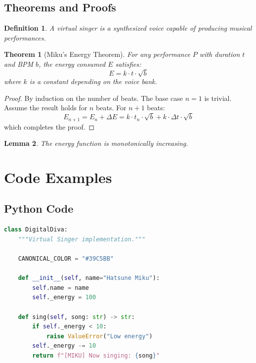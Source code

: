\documentclass[12pt, a4paper]{article}
\newtheorem{theorem}{Theorem}[section]
\newtheorem{lemma}[theorem]{Lemma}
\newtheorem{definition}{Definition}[section]
\begin{document}
\subsection{Theorems and Proofs}

\begin{definition}
A \emph{virtual singer} is a synthesized voice capable of producing musical performances.
\end{definition}

\begin{theorem}[Miku's Energy Theorem]
\label{thm:energy}
For any performance $P$ with duration $t$ and BPM $b$, the energy consumed $E$ satisfies:
\[
    E = k \cdot t \cdot \sqrt{b}
\]
where $k$ is a constant depending on the voice bank.
\end{theorem}

\begin{proof}
By induction on the number of beats. The base case $n=1$ is trivial.
Assume the result holds for $n$ beats. For $n+1$ beats:
\[
    E_{n+1} = E_n + \Delta E = k \cdot t_n \cdot \sqrt{b} + k \cdot \Delta t \cdot \sqrt{b}
\]
which completes the proof.
\end{proof}

\begin{lemma}
The energy function is monotonically increasing.
\end{lemma}


\section{Code Examples}

\subsection{Python Code}

\begin{lstlisting}[language=Python, caption={Miku Synthesizer Class}]
class DigitalDiva:
    """Virtual Singer implementation."""

    CANONICAL_COLOR = "#39C5BB"

    def __init__(self, name="Hatsune Miku"):
        self.name = name
        self._energy = 100

    def sing(self, song: str) -> str:
        if self._energy < 10:
            raise ValueError("Low energy")
        self._energy -= 10
        return f"[MIKU] Now singing: {song}"
\end{lstlisting}
\end{document}
